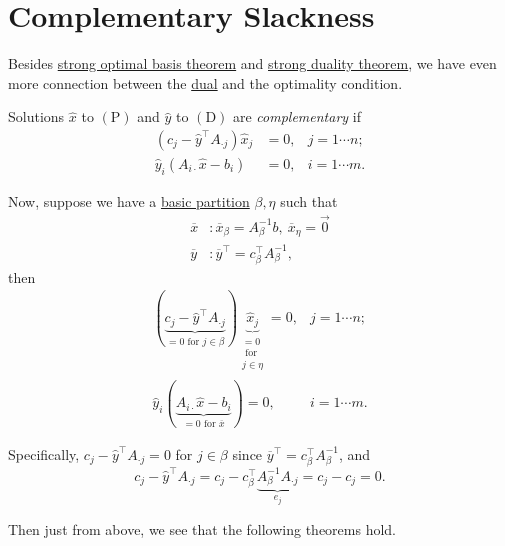 \section{Complementary Slackness}
Besides \hyperref[thm:strong-optimal-basis]{strong optimal basis theorem} and \hyperref[thm:strong-duality]{strong duality theorem}, we have even more connection between the \hyperref[def:dual]{dual} and the optimality condition.

\begin{definition}[Complementary]\label{def:complementary}
	Solutions \(\hat{x}\) to \((\mathrm{P})\) and \(\hat{y}\) to \((\mathrm{D})\) are \emph{complementary} if
	\[
		\begin{aligned}
			(c_{j} - \hat{y}^{\top} A_{\cdot j}) \hat{x}_j & = 0, & j = 1\cdots n; \\
			\hat{y}_i(A_{i\cdot} \hat{x} - b_{i})          & = 0, & i = 1\cdots m.
		\end{aligned}
	\]
\end{definition}
Now, suppose we have a \hyperref[def:basic-partition]{basic partition} \(\beta, \eta\) such that
\[
	\begin{split}
		\overline{x}&\colon \overline{x}_{\beta} = A^{-1}_{\beta}b,\ \overline{x}_{\eta} = \vec{0}\\
		\overline{y}&\colon \overline{y}^{\top} = c^{\top}_{\beta}A^{-1}_{\beta},
	\end{split}
\]
then
\[
	\begin{split}
		(\underbrace{c_{j} - \hat{y}^{\top} A_{\cdot j}}_{ = 0\text{ for }j\in \beta}) \underbrace{\hat{x}_j}_{ \substack{= 0 \\\text{ for }\\j\in \eta}} = 0, & j = 1\cdots n; \\
		\hat{y}_i(\underbrace{A_{i\cdot} \hat{x} - b_{i}}_{ = 0 \text{ for }\overline{x}}) = 0, & i = 1\cdots m.
	\end{split}
\]

\begin{note}
	Specifically, \(c_{j} - \hat{y}^{\top}A_{\cdot j} = 0\) for \(j\in\beta\) since \(\overline{y}^{\top} = c^{\top}_{\beta}A^{-1}_{\beta}\), and
	\[
		c_{j} - \hat{y}^{\top}A_{\cdot j} = c_{j} - c^{\top}_{\beta}\underbrace{A^{-1}_{\beta}A_{\cdot j}}_{e_{j}} = c_{j} - c_{j} = 0.
	\]
\end{note}

Then just from above, we see that the following theorems hold.

